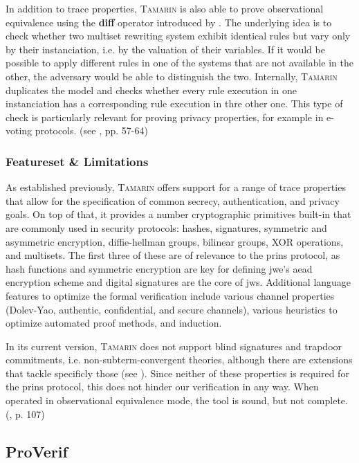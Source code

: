 In addition to trace properties, \textsc{Tamarin} is also able to prove observational equivalence using the \textsf{\textbf{diff}} operator introduced by \cite{basin2015automated}.
The underlying idea is to check whether two multiset rewriting system exhibit identical rules but vary only by their instanciation, i.e. by the valuation of their variables.
If it would be possible to apply different rules in one of the systems that are not available in the other, the adversary would be able to distinguish the two.
Internally, \textsc{Tamarin} duplicates the model and checks whether every rule execution in one instanciation has a corresponding rule execution in thre other one.
This type of check is particularly relevant for proving privacy properties, for example in e-voting protocols. (see \cite{tamarin2019manual}, pp. 57-64)

\subsubsection{Featureset \& Limitations}

As established previously, \textsc{Tamarin} offers support for a range of trace properties that allow for the specification of common secrecy, authentication, and privacy goals.
On top of that, it provides a number cryptographic primitives built-in that are commonly used in security protocols: hashes, signatures, symmetric and asymmetric encryption, diffie-hellman groups, bilinear groups, XOR operations, and multisets. 
The first three of these are of relevance to the \gls{prins} protocol, as hash functions and symmetric encryption are key for defining \gls{jwe}'s \gls{aead} encryption scheme and digital signatures are the core of \gls{jws}.
Additional language features to optimize the formal verification include various channel properties (Dolev-Yao, authentic, confidential, and secure channels), various heuristics to optimize automated proof methods, and induction.

In its current version, \textsc{Tamarin} does not support blind signatures and trapdoor commitments, i.e. non-subterm-convergent theories, although there are extensions that tackle specificly those (see \cite{dreier2017beyond}).
Since neither of these properties is required for the \gls{prins} protocol, this does not hinder our verification in any way.
When operated in observational equivalence mode, the tool is sound, but not complete. (\cite{tamarin2019manual}, p. 107)

\subsection{ProVerif}
\label{ssec:proverif}

